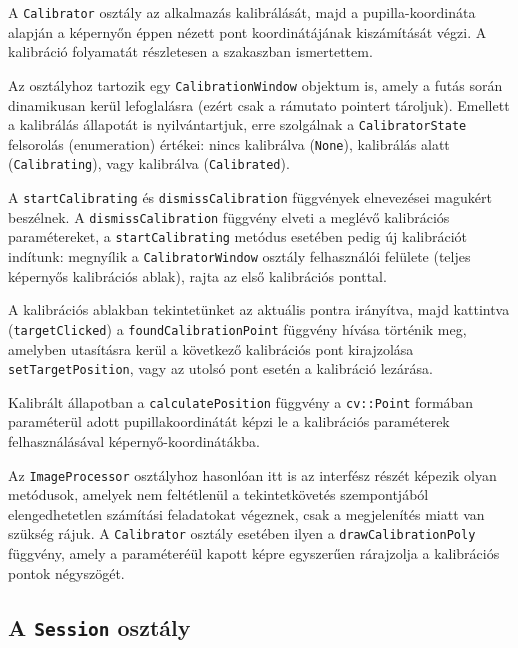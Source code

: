 A \texttt{Calibrator} osztály az alkalmazás kalibrálását, majd a pupilla-koordináta alapján a képernyőn éppen nézett pont koordinátájának kiszámítását végzi. A kalibráció folyamatát részletesen a  szakaszban ismertettem.

Az osztályhoz tartozik egy \texttt{CalibrationWindow} objektum is, amely a futás során dinamikusan kerül lefoglalásra (ezért csak a rámutato pointert tároljuk). Emellett a kalibrálás állapotát is nyilvántartjuk, erre szolgálnak a \texttt{CalibratorState} felsorolás (enumeration) értékei: nincs kalibrálva (\texttt{None}), kalibrálás alatt (\texttt{Calibrating}), vagy kalibrálva (\texttt{Calibrated}).

\bigskip

A \texttt{startCalibrating} és \texttt{dismissCalibration} függvények elnevezései magukért beszélnek. A \texttt{dismissCalibration} függvény elveti a meglévő kalibrációs paramétereket, a \texttt{startCalibrating} metódus esetében pedig új kalibrációt indítunk: megnyílik a \texttt{CalibratorWindow} osztály felhasználói felülete (teljes képernyős kalibrációs ablak), rajta az első kalibrációs ponttal.

A kalibrációs ablakban tekintetünket az aktuális pontra irányítva, majd kattintva (\texttt{targetClicked}) a \texttt{foundCalibrationPoint} függvény hívása történik meg, amelyben utasításra kerül a következő kalibrációs pont kirajzolása \texttt{setTargetPosition}, vagy az utolsó pont esetén a kalibráció lezárása.

\bigskip

Kalibrált állapotban a \texttt{calculatePosition} függvény a \texttt{cv::Point} formában paraméterül adott pupillakoordinátát képzi le a kalibrációs paraméterek felhasználásával képernyő-koordinátákba.

\bigskip

Az \texttt{ImageProcessor} osztályhoz hasonlóan itt is az interfész részét képezik olyan metódusok, amelyek nem feltétlenül a tekintetkövetés szempontjából elengedhetetlen számítási feladatokat végeznek, csak a megjelenítés miatt van szükség rájuk. A \texttt{Calibrator} osztály esetében ilyen a \texttt{drawCalibrationPoly} függvény, amely a paraméteréül kapott képre egyszerűen rárajzolja a kalibrációs pontok négyszögét.

\subsection{A \texttt{Session} osztály}\label{sect:session}

